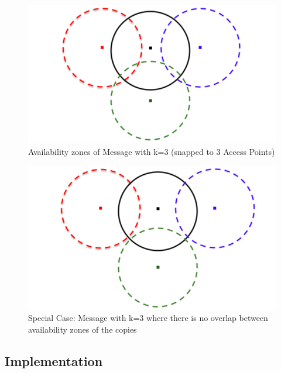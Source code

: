 	\vspace{5mm}
	\begin{figure}[h!]
		\centering
		\includegraphics[scale=0.45]{./figures/snapped-to-ap-3}
		\caption{Availability zones of Message with k=3 (snapped to 3 Access Points)}
	\end{figure}
	\begin{figure}[h!]
		\centering
		\includegraphics[scale=0.45]{./figures/snapped-to-ap-4}
		\caption{Special Case: Message with k=3 where there is no overlap between availability zones of the copies}
	\end{figure}

\newpage
\subsection{Implementation}
